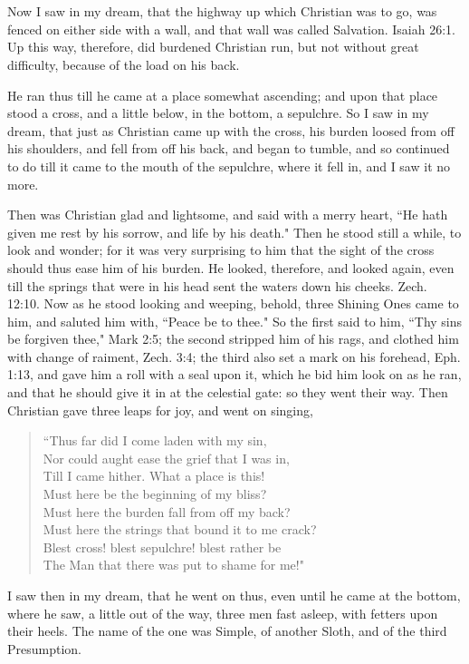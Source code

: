 \chapter[THE THIRD STAGE]{}

Now I saw in my dream, that the highway up which Christian was to go, was fenced on either side with a wall, and that wall was called Salvation. Isaiah 26:1. Up this way, therefore, did burdened Christian run, but not without great difficulty, because of the load on his back.

He ran thus till he came at a place somewhat ascending; and upon that place stood a cross, and a little below, in the bottom, a sepulchre. So I saw in my dream, that just as Christian came up with the cross, his burden loosed from off his shoulders, and fell from off his back, and began to tumble, and so continued to do till it came to the mouth of the sepulchre, where it fell in, and I saw it no more.

Then was Christian glad and lightsome, and said with a merry heart, ``He hath given me rest by his sorrow, and life by his death." Then he stood still a while, to look and wonder; for it was very surprising to him that the sight of the cross should thus ease him of his burden. He looked, therefore, and looked again, even till the springs that were in his head sent the waters down his cheeks. Zech. 12:10. Now as he stood looking and weeping, behold, three Shining Ones came to him, and saluted him with, ``Peace be to thee." So the first said to him, ``Thy sins be forgiven thee," Mark 2:5; the second stripped him of his rags, and clothed him with change of raiment, Zech. 3:4; the third also set a mark on his forehead, Eph. 1:13, and gave him a roll with a seal upon it, which he bid him look on as he ran, and that he should give it in at the celestial gate: so they went their way. Then Christian gave three leaps for joy, and went on singing,
\begin{verse}
``Thus far did I come laden with my sin,\\
Nor could aught ease the grief that I was in,\\
Till I came hither. What a place is this!\\
Must here be the beginning of my bliss?\\
Must here the burden fall from off my back?\\
Must here the strings that bound it to me crack?\\
Blest cross! blest sepulchre! blest rather be\\
The Man that there was put to shame for me!"\\
\end{verse}
I saw then in my dream, that he went on thus, even until he came at the bottom, where he saw, a little out of the way, three men fast asleep, with fetters upon their heels. The name of the one was Simple, of another Sloth, and of the third Presumption.

